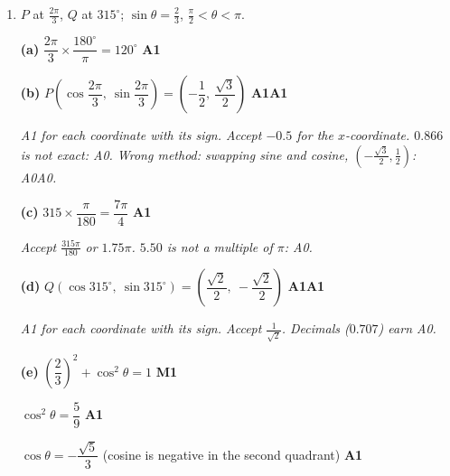 \documentclass[12pt, twoside]{article}
\begin{document}
\begin{enumerate}[itemsep=0.3cm]
\textbf{(d)} The maximum of $f$ at $x = \frac{\pi}{4}$ is at $x = 0$ on the
graph of $g$: the graph has moved $\frac{\pi}{4}$ to the left, and
$f(x + h)$ is a translation to the left by $h$. \hfill \textbf{R1}

$g(x) = f\!\left(x + \dfrac{\pi}{4}\right)$ \hfill \textbf{A1}

\emph{R1 for any valid reason: the graph moves left; a point of $f$ appears
$\frac{\pi}{4}$ earlier on $g$; or a check such as
$g(0) = f\!\left(\frac{\pi}{4}\right) = 1$. Do not award R0A1: the choice
with no reason earns 0. Wrong method: $f\!\left(x - \frac{\pi}{4}\right)$
(a minus sign for a move to the left): R0A0.}

\newpage

\item[2.] [Maximum mark: 10]

$P$ at $\frac{2\pi}{3}$, $Q$ at $315^\circ$; $\sin\theta = \frac{2}{3}$,
$\frac{\pi}{2} < \theta < \pi$.

\textbf{(a)} $\dfrac{2\pi}{3} \times \dfrac{180^\circ}{\pi} = 120^\circ$
\hfill \textbf{A1}

\textbf{(b)} $P\left(\cos\dfrac{2\pi}{3},\ \sin\dfrac{2\pi}{3}\right)
= \left(-\dfrac{1}{2},\ \dfrac{\sqrt{3}}{2}\right)$ \hfill \textbf{A1A1}

\emph{A1 for each coordinate with its sign. Accept $-0.5$ for the
$x$-coordinate. $0.866$ is not exact: A0. Wrong method: swapping sine and
cosine, $\left(-\frac{\sqrt{3}}{2}, \frac{1}{2}\right)$: A0A0.}

\textbf{(c)} $315 \times \dfrac{\pi}{180} = \dfrac{7\pi}{4}$ \hfill \textbf{A1}

\emph{Accept $\frac{315\pi}{180}$ or $1.75\pi$. $5.50$ is not a multiple
of $\pi$: A0.}

\textbf{(d)} $Q\left(\cos 315^\circ,\ \sin 315^\circ\right)
= \left(\dfrac{\sqrt{2}}{2},\ -\dfrac{\sqrt{2}}{2}\right)$ \hfill \textbf{A1A1}

\emph{A1 for each coordinate with its sign. Accept $\frac{1}{\sqrt{2}}$.
Decimals ($0.707$) earn A0.}

\textbf{(e)} $\left(\dfrac{2}{3}\right)^{2} + \cos^{2}\theta = 1$
\hfill \textbf{M1}

$\cos^{2}\theta = \dfrac{5}{9}$ \hfill \textbf{A1}

$\cos\theta = -\dfrac{\sqrt{5}}{3}$ \quad (cosine is negative in the second
quadrant) \hfill \textbf{A1}


\end{enumerate}
\end{document}
